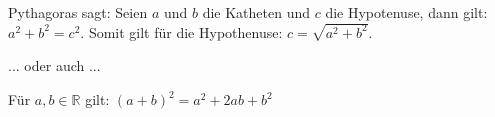 
Pythagoras sagt: Seien $a$ und $b$ die Katheten und $c$ die Hypotenuse, dann gilt: $a^2+b^2=c^2$. Somit gilt für die Hypothenuse: $c=\sqrt{a^2+b^2}$.

\bigskip  
... oder auch ...
\bigskip  

Für $a,b \in \mathbb{R}$ gilt: $(a+b)^{2} = a^{2} + 2ab + b^{2}$
